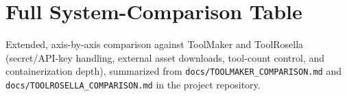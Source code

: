 \section{Full System-Comparison Table}
\label{sec:appendix-comparison}
Extended, axis-by-axis comparison against ToolMaker and ToolRosella (secret/API-key handling, external asset downloads, tool-count control, and containerization depth), summarized from \texttt{docs/TOOLMAKER\_COMPARISON.md} and \texttt{docs/TOOLROSELLA\_COMPARISON.md} in the project repository.
